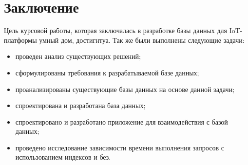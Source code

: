 \chapter*{Заключение}

Цель курсовой работы, которая заключалась в разработке базы данных 
для IoT-платформы умный дом, достигнтуа.
Так же были выполнены следующие задачи:

\begin{itemize}[left=\parindent]
    \item проведен анализ существующих решений;
    \item сформулированы требования к разрабатываемой базе данных;
    \item проанализированы существующие базы данных на основе данной задачи;
    \item спроектирована и разработана база данных;
    \item спроектировано и разработано приложение для взаимодействия с базой данных;
    \item проведено исследование зависимости времени выполнения запросов
    с использованием индексов и без.
\end{itemize}
